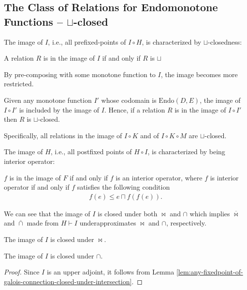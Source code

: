 \documentclass{llncs}
\newcommand{\Endo}{\mathrm{Endo}}
\newcommand{\join}{\sqcup}
\newcommand{\comp}{\circ}
\newcommand{\bowtielift}{\mathbin{\overline{\bowtie}}}
\newcommand{\caplift}{\mathbin{\overline{\cap}}}
\begin{document}
  \subsection{The Class of Relations for Endomonotone Functions -- $\join$-closed}
  The image of $I$, i.e., all prefixed-points of $I \comp H$, is characterized by $\join$-closedness:
  \begin{theorem}\label{thm:join-closed}
    A relation $R$ is in the image of $I$ if and only if $R$ is $\join$ 
  \end{theorem}

  By pre-composing with some monotone function to $I$, the image becomes more restricted.
  \begin{proposition} \label{pr:restriction-subset}
    Given any monotone function $I'$ whose codomain is $\Endo(D, E)$, the image of $I \comp I'$ is included by the image of $I$.
    Hence, if a relation $R$ is in the image of $I \comp I'$ then $R$ is $\join$-closed.
  \end{proposition}
  Specifically, all relations in the image of $I \comp K$ and of $I \comp K \comp M$ are $\join$-closed.

  The image of $H$, i.e., all postfixed points of $H \comp I$, is characterized by being interior operator:
  \begin{proposition}\label{prop:interior-op}
  $f$ is in the image of $F$ if and only if $f$ is an interior operator,
  where $f$ is interior operator if and only if $f$ satisfies the following condition
  \begin{align*}
    f(e) \leq  e \sqcap f (f (e)).
  \end{align*}
  \end{proposition}

  We can see that the image of $I$ is closed under both $\bowtie$ and $\cap$ which implies $\bowtielift$ and $\caplift$ made from $H \vdash I$ underapproximates $\bowtie$ and $\cap$, respectively.
  \begin{proposition}\label{prop:endo-closed-under-composition}
    The image of $I$ is closed under $\bowtie$.
  \end{proposition}
  \begin{proposition}\label{prop:endo-closed-under-intersection}
    The image of $I$ is closed under $\cap$.
    \begin{proof}
      Since $I$ is an upper adjoint, it follows from Lemma \ref{lem:any-fixedpoint-of-galois-connection-closed-under-intersection}.
    \end{proof}
  \end{proposition}
\end{document}
